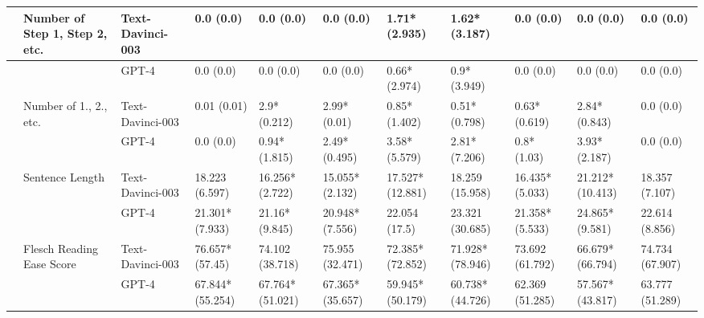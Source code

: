\begin{tabular}{x{0.75cm}|x{1.5cm}|x{0.75cm}|x{0.75cm}|x{0.75cm}|x{0.75cm}|x{0.75cm}|x{0.75cm}|x{0.75cm}|x{0.75cm}|x{0.75cm}}
\hline
 & Number of Step 1, Step 2, etc. & Text-Davinci-003 & 0.0 (0.0) & 0.0 (0.0) & 0.0 (0.0) & 1.71* (2.935) & 1.62* (3.187) & 0.0 (0.0) & 0.0 (0.0) & 0.0 (0.0) \\
\hline
 &  & GPT-4 & 0.0 (0.0) & 0.0 (0.0) & 0.0 (0.0) & 0.66* (2.974) & 0.9* (3.949) & 0.0 (0.0) & 0.0 (0.0) & 0.0 (0.0) \\
\hline
 & Number of 1., 2., etc. & Text-Davinci-003 & 0.01 (0.01) & 2.9* (0.212) & 2.99* (0.01) & 0.85* (1.402) & 0.51* (0.798) & 0.63* (0.619) & 2.84* (0.843) & 0.0 (0.0) \\
\hline
 &  & GPT-4 & 0.0 (0.0) & 0.94* (1.815) & 2.49* (0.495) & 3.58* (5.579) & 2.81* (7.206) & 0.8* (1.03) & 3.93* (2.187) & 0.0 (0.0) \\
\hline
 & Sentence Length & Text-Davinci-003 & 18.223 (6.597) & 16.256* (2.722) & 15.055* (2.132) & 17.527* (12.881) & 18.259 (15.958) & 16.435* (5.033) & 21.212* (10.413) & 18.357 (7.107) \\
\hline
 &  & GPT-4 & 21.301* (7.933) & 21.16* (9.845) & 20.948* (7.556) & 22.054 (17.5) & 23.321 (30.685) & 21.358* (5.533) & 24.865* (9.581) & 22.614 (8.856) \\
\hline
 & Flesch Reading Ease Score & Text-Davinci-003 & 76.657* (57.45) & 74.102 (38.718) & 75.955 (32.471) & 72.385* (72.852) & 71.928* (78.946) & 73.692 (61.792) & 66.679* (66.794) & 74.734 (67.907) \\
\hline
 &  & GPT-4 & 67.844* (55.254) & 67.764* (51.021) & 67.365* (35.657) & 59.945* (50.179) & 60.738* (44.726) & 62.369 (51.285) & 57.567* (43.817) & 63.777 (51.289) \\
\hline
\bottomrule
\end{tabular}
